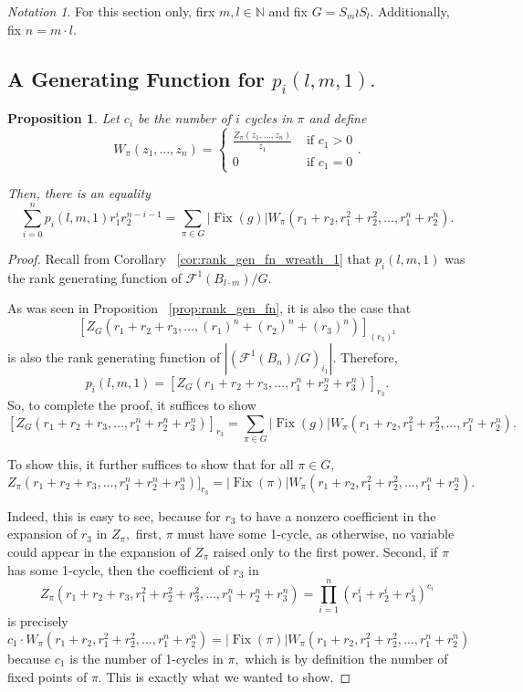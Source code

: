 \documentclass{amsart}
\newtheorem{prop}[thm]{Proposition}
\theoremstyle{remark}
\newtheorem{note}[thm]{Notation}
\newcommand\ssec{\subsection}
\newcommand\BN{{\mathbb N}}
\def\Fix{\operatorname{Fix}}
\begin{document}
\begin{note}
For this section only, firx $m,l \in \BN$ and fix $G = S_m \wr S_l.$ Additionally, fix $n = m \cdot l.$
\end{note}

\ssec{A Generating Function for $p_i(l,m,1).$}

\begin{prop}
Let $c_i$ be the number of $i$ cycles in $\pi$ and define $$W_\pi(z_1,\ldots, z_n) = \begin{cases}\frac {Z_\pi(z_1,\ldots,z_n)}{z_1} &\text{ if } c_1 > 0 \\
0 &\text{ if } c_1 = 0
\end{cases}.$$

Then, there is an equality
$$\sum_{i=0}^n p_i(l,m,1) r_1^ir_2^{n-i-1} = \sum_{\pi \in G} |\Fix(g)|W_\pi(r_1 + r_2,r_1^2+r_2^2,\ldots,r_1^n + r_2^n).$$
\end{prop}
\begin{proof}
Recall from Corollary ~\ref{cor:rank_gen_fn_wreath_1} that $p_i(l,m,1)$ was the rank generating function of $\mathcal F^1(B_{l\cdot m})/G$. 

As was seen in Proposition ~\ref{prop:rank_gen_fn}, it is also the case that $$[Z_G(r_1+r_2+r_3,\ldots, (r_1)^n+(r_2)^n+(r_3)^n)]_{(r_3)^1}$$ is also the rank generating function of $|(\mathcal F^{1}(B_n)/G)_{i_1}|.$
Therefore, 
$$p_i(l,m,1)=[Z_G(r_1+r_2 + r_3,\ldots, r_1^n+ r_2^n + r_3^n)]_{r_3}.$$
So, to complete the proof, it suffices to show 
$$[Z_G(r_1+r_2 + r_3,\ldots, r_1^n+ r_2^n + r_3^n)]_{r_3} = \sum_{\pi \in G} |\Fix(g)|W_\pi(r_1 + r_2,r_1^2+r_2^2,\ldots,r_1^n + r_2^n).$$

To show this, it further suffices to show that for all $\pi \in G,$
$$Z_\pi(r_1+r_2 + r_3,\ldots, r_1^n+ r_2^n + r_3^n)]_{r_3} =  |\Fix(\pi)|W_\pi(r_1 + r_2,r_1^2+r_2^2,\ldots,r_1^n + r_2^n).$$

Indeed, this is easy to see, because for $r_3$ to have a nonzero coefficient in the expansion of $r_3$ in $Z_\pi,$ first, $\pi$ must have some 1-cycle, as otherwise, no variable could appear in the expansion of $Z_\pi$ raised only to the first power. Second, if $\pi$ has some 1-cycle, then the coefficient of $r_3$ in $$Z_\pi(r_1 + r_2+r_3,r_1^2+r_2^2+r_3^2,\ldots,r_1^n + r_2^n+r_3^n) = \prod_{i=1}^n (r_1^i+r_2^i+r_3^i)^{c_i}$$ is precisely 
$$c_1 \cdot W_\pi(r_1 + r_2,r_1^2+r_2^2,\ldots,r_1^n + r_2^n) = |\Fix(\pi)|W_\pi(r_1 + r_2,r_1^2+r_2^2,\ldots,r_1^n + r_2^n)$$ because $c_1$ is the number of 1-cycles in $\pi,$ which is by definition the number of fixed points of $\pi.$ This is exactly what we wanted to show.
\end{proof}
\end{document}
